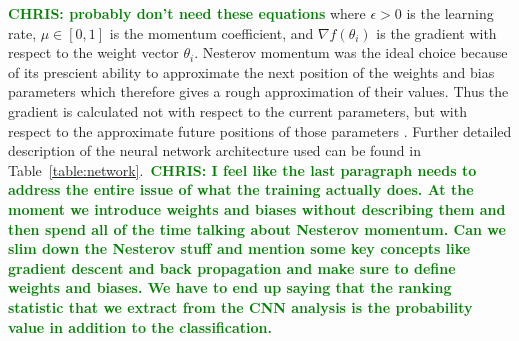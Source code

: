 \documentclass[%
 amsmath,amssymb,
 aps,
 twocolumn,
 prl,
 reprint,
floatfix,
]{revtex4-1}
\newcommand{\chris}[1]{\textbf{\textcolor{green}{CHRIS: #1}}}
\begin{document}
\chris{probably don't need these equations} where $\epsilon > 0$ is the
learning rate, $\mu \in [0,1]$ is the momentum coefficient, and $\nabla
f(\theta_{i})$ is the gradient with respect to the weight vector $\theta_{i}$.
Nesterov momentum was the ideal choice because of its prescient ability to
approximate the next position of the weights and bias parameters which
therefore gives a rough approximation of their values. Thus the gradient is
calculated not with respect to the current parameters, but with respect to the
approximate future positions of those parameters
\cite{Sutskever:2013:IIM:3042817.3043064}. Further detailed description of the
neural network architecture used can be found in
Table~\ref{table:network}.~\chris{I feel like the last paragraph needs to
address the entire issue of what the training actually does. At the moment we
introduce weights and biases without describing them and then spend all of the
time talking about Nesterov momentum. Can we slim down the Nesterov stuff and
mention some key concepts like gradient descent and back propagation and make
sure to define weights and biases. We have to end up saying that the ranking
statistic that we extract from the CNN analysis is the probability value in
addition to the classification.}
\end{document}
